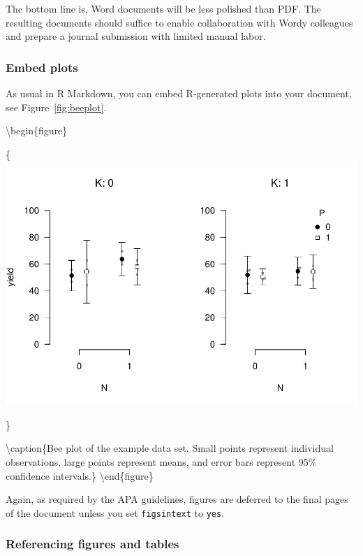 \documentclass[
  english,
  man]{apa6}
\begin{document}
The bottom line is, Word documents will be less polished than PDF.
The resulting documents should suffice to enable collaboration with Wordy colleagues and prepare a journal submission with limited manual labor.

\hypertarget{embed-plots}{%
\subsubsection{Embed plots}\label{embed-plots}}

As usual in R Markdown, you can embed R-generated plots into your document, see Figure~\ref{fig:beeplot}.

\textbackslash begin\{figure\}

\{\centering \includegraphics{template_files/figure-latex/beeplot-1}

\}

\textbackslash caption\{Bee plot of the example data set. Small points represent individual observations, large points represent means, and error bars represent 95\% confidence intervals.\}\label{fig:beeplot}
\textbackslash end\{figure\}

Again, as required by the APA guidelines, figures are deferred to the final pages of the document unless you set \texttt{figsintext} to \texttt{yes}.

\hypertarget{referencing-figures-and-tables}{%
\subsubsection{Referencing figures and tables}\label{referencing-figures-and-tables}}
\end{document}
